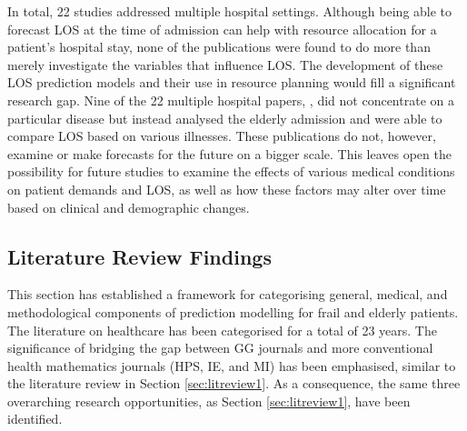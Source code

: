 \documentclass[../thesis.tex]{subfiles}
\begin{document}
In total, 22 studies addressed multiple hospital settings. Although being able to forecast LOS at the time of admission can help with resource allocation for a patient's hospital stay, none of the publications were found to do more than merely investigate the variables that influence LOS. The development of these LOS prediction models and their use in resource planning would fill a significant research gap. 
Nine of the 22 multiple hospital papers, \cite{Hubbard2017,Kim2018,Liotta2012,Lisk2018,Naouri2022,Pilotto2016,Shebeshi2021,Volpato2014,Wong2008}, did not concentrate on a particular disease but instead analysed the elderly admission and were able to compare LOS based on various illnesses. These publications do not, however, examine or make forecasts for the future on a bigger scale. This leaves open the possibility for future studies to examine the effects of various medical conditions on patient demands and LOS, as well as how these factors may alter over time based on clinical and demographic changes.


\subsection{Literature Review Findings}\label{sec:lr2findings}

This section has established a framework for categorising general, medical, and methodological components of prediction modelling for frail and elderly patients. The literature on healthcare has been categorised for a total of 23 years. The significance of bridging the gap between GG journals and more conventional health mathematics journals (HPS, IE, and MI) has been emphasised, similar to the literature review in Section \ref{sec:litreview1}. As a consequence, the same three  overarching research opportunities, as Section \ref{sec:litreview1}, have been identified.
\end{document}
